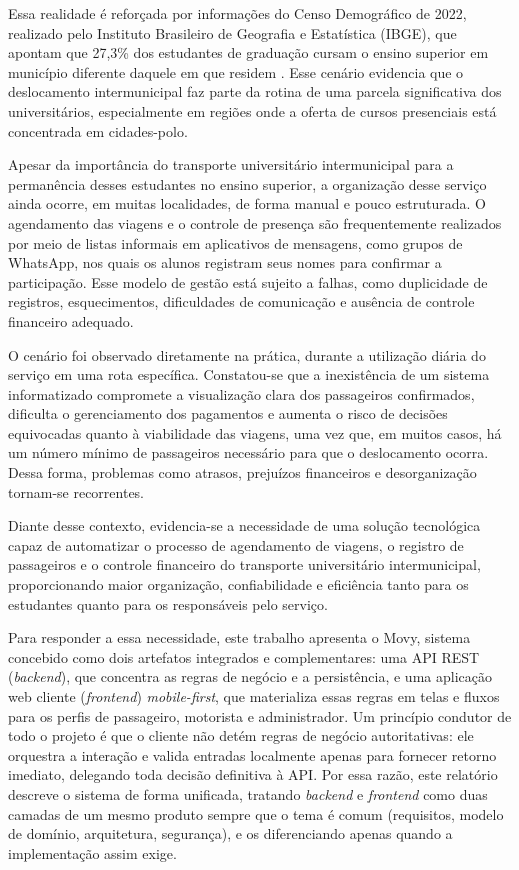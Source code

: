 \documentclass[12pt,openright,oneside,a4paper]{article}
\begin{document}
Essa realidade é reforçada por informações do Censo Demográfico de 2022, realizado pelo Instituto Brasileiro de Geografia e Estatística (IBGE), que apontam que 27,3\% dos estudantes de graduação cursam o ensino superior em município diferente daquele em que residem \cite{ibgeDeslocamentoEstudo}. Esse cenário evidencia que o deslocamento intermunicipal faz parte da rotina de uma parcela significativa dos universitários, especialmente em regiões onde a oferta de cursos presenciais está concentrada em cidades-polo.

Apesar da importância do transporte universitário intermunicipal para a permanência desses estudantes no ensino superior, a organização desse serviço ainda ocorre, em muitas localidades, de forma manual e pouco estruturada. O agendamento das viagens e o controle de presença são frequentemente realizados por meio de listas informais em aplicativos de mensagens, como grupos de WhatsApp, nos quais os alunos registram seus nomes para confirmar a participação. Esse modelo de gestão está sujeito a falhas, como duplicidade de registros, esquecimentos, dificuldades de comunicação e ausência de controle financeiro adequado.

O cenário foi observado diretamente na prática, durante a utilização diária do serviço em uma rota específica.  Constatou-se que a inexistência de um sistema informatizado compromete a visualização clara dos passageiros confirmados, dificulta o gerenciamento dos pagamentos e aumenta o risco de decisões equivocadas quanto à viabilidade das viagens, uma vez que, em muitos casos, há um número mínimo de passageiros necessário para que o deslocamento ocorra. Dessa forma, problemas como atrasos, prejuízos financeiros e desorganização tornam-se recorrentes.

Diante desse contexto, evidencia-se a necessidade de uma solução tecnológica capaz de automatizar o processo de agendamento de viagens, o registro de passageiros e o controle financeiro do transporte universitário intermunicipal, proporcionando maior organização, confiabilidade e eficiência tanto para os estudantes quanto para os responsáveis pelo serviço.

Para responder a essa necessidade, este trabalho apresenta o Movy, sistema concebido como dois artefatos integrados e complementares: uma API REST (\textit{backend}), que concentra as regras de negócio e a persistência, e uma aplicação web cliente (\textit{frontend}) \textit{mobile-first}, que materializa essas regras em telas e fluxos para os perfis de passageiro, motorista e administrador. Um princípio condutor de todo o projeto é que o cliente não detém regras de negócio autoritativas: ele orquestra a interação e valida entradas localmente apenas para fornecer retorno imediato, delegando toda decisão definitiva à API. Por essa razão, este relatório descreve o sistema de forma unificada, tratando \textit{backend} e \textit{frontend} como duas camadas de um mesmo produto sempre que o tema é comum (requisitos, modelo de domínio, arquitetura, segurança), e os diferenciando apenas quando a implementação assim exige.
\end{document}
